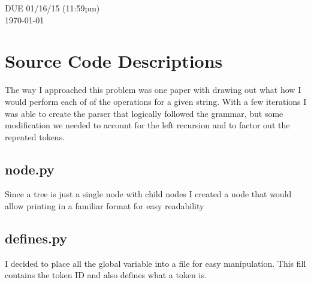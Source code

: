 \documentclass[letterpaper,10pt]{article}
\begin{document}
\begin{titlepage}

DUE 01/16/15 (11:59pm)\\
{\large \today}\\[3cm] %


 

\vfill %

\end{titlepage}

\tableofcontents
\vfill %
\newpage

\section{Source Code Descriptions}
\begin{mdframed}[style=MyFrame]
The way I approached this problem was one paper with drawing out what how I would perform each of of the operations for a given string. With a few iterations I was able to create the parser that logically followed the grammar, but some modification we needed to account for the left recursion and to factor out the repeated tokens. 
\end{mdframed}
\subsection{node.py}
\begin{mdframed}[style=MyFrame]
Since a tree is just a single node with child nodes I created a node that would allow printing in a familiar format for easy readability 
\end{mdframed}
\subsection{defines.py}
\begin{mdframed}[style=MyFrame]
I decided to place all the global variable into a file for easy manipulation. This fill contains the token ID and also defines what a token is. 
\end{mdframed}
\end{document}

